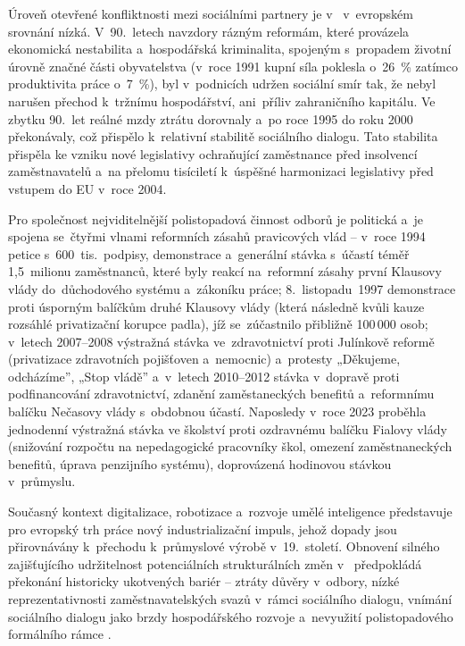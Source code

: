 Úroveň otevřené konfliktnosti mezi sociálními partnery je v~ v~evropském srovnání nízká. V~90.~letech navzdory rázným reformám, které provázela ekonomická nestabilita a~hospodářská kriminalita, spojeným s~propadem životní úrovně značné části obyvatelstva (v~roce 1991 kupní síla poklesla o~\SI{26}{\percent} zatímco produktivita práce o~\SI{7}{\percent}), byl v~podnicích udržen sociální smír tak, že nebyl narušen přechod k~tržnímu hospodářství, ani~příliv zahraničního kapitálu. Ve zbytku 90.~let reálné mzdy ztrátu dorovnaly a~po roce 1995 do roku 2000 překonávaly, což přispělo k~relativní stabilitě sociálního dialogu. Tato stabilita přispěla ke vzniku nové legislativy ochraňující zaměstnance před insolvencí zaměstnavatelů a~na přelomu tisíciletí k~úspěšné harmonizaci legislativy před vstupem do \acs{EU} v~roce 2004.\par
Pro společnost nejviditelnější polistopadová činnost odborů je politická a~je spojena se~čtyřmi vlnami reformních zásahů pravicových vlád -- v~roce 1994 petice s~600~tis.\ podpisy, demonstrace a~generální stávka s~účastí téměř 1,5~milionu zaměstnanců, které byly reakcí na~reformní zásahy první Klausovy vlády do~důchodového systému a~zákoníku práce; 8.~listopadu~1997 demonstrace proti úsporným balíčkům druhé Klausovy vlády (která následně kvůli kauze rozsáhlé privatizační korupce padla), jíž se~zúčastnilo přibližně 100\,000 osob; v~letech 2007--2008 výstražná stávka ve~zdravotnictví proti Julínkově reformě (privatizace zdravotních pojišťoven a~nemocnic) a~protesty „Děkujeme, odcházíme”, „Stop vládě” a~v~letech 2010--2012 stávka v~dopravě proti podfinancování zdravotnictví, zdanění zaměstaneckých benefitů a~reformnímu balíčku Nečasovy vlády s~obdobnou účastí.
Naposledy v~roce 2023 proběhla jednodenní výstražná stávka ve školství proti ozdravnému balíčku Fialovy vlády (snižování rozpočtu na nepedagogické pracovníky škol, omezení zaměstnaneckých benefitů, úprava penzijního systému), doprovázená hodinovou stávkou v~průmyslu.~\cite{Hala_RozvojSocialnihoDialoguCR2002}~\cite{Casale_SocialDialogueCzechSuccessStory2001}\par

Současný kontext digitalizace, robotizace a~rozvoje umělé inteligence představuje pro evropský trh práce nový industrializační impuls, jehož dopady jsou přirovnávány k~přechodu k~průmyslové výrobě v~19.~století.
Obnovení silného  zajišťujícího udržitelnost potenciálních strukturálních změn v~ předpokládá překonání historicky ukotvených bariér -- ztráty důvěry v~odbory, nízké reprezentativnosti zaměstnavatelských svazů v~rámci sociálního dialogu, vnímání sociálního dialogu jako brzdy hospodářského rozvoje a~nevyužití polistopadového formálního rámce .\par

